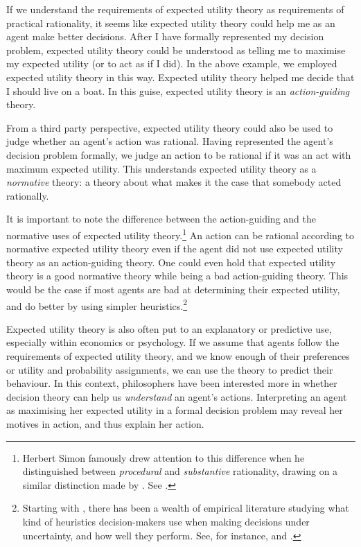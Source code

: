 If we understand the requirements of expected utility theory as requirements of practical rationality, it seems like expected utility theory could help me as an agent make better decisions. After I have formally represented my decision problem, expected utility theory could be understood as telling me to maximise my expected utility (or to act as if I did). In the above example, we employed expected utility theory in this way. Expected utility theory helped me decide that I should live on a boat. In this guise, expected utility theory is an {\em action-guiding} theory.

From a third party perspective, expected utility theory could also be used to judge whether an agent's action was rational. Having represented the agent's decision problem formally, we judge an action to be rational if it was an act with maximum expected utility. This understands expected utility theory as a {\em normative} theory: a theory about what makes it the case that somebody acted rationally.

It is important to note the difference between the action-guiding and the normative uses of expected utility theory.\footnote{Herbert Simon famously drew attention to this difference when he distinguished between {\em procedural} and {\em substantive} rationality, drawing on a similar distinction made by \citet{Weber1922}. See \citet{Simon1976}.} An action can be rational according to normative expected utility theory even if the agent did not use expected utility theory as an action-guiding theory. One could even hold that expected utility theory is a good normative theory while being a bad action-guiding theory. This would be the case if most agents are bad at determining their expected utility, and do better by using simpler heuristics.\footnote{Starting with \citet{TverskyKahneman1974}, there has been a wealth of empirical literature studying what kind of heuristics decision-makers use when making decisions under uncertainty, and how well they perform. See, for instance, \citet{Payneetal1993} and \citet{GigerenzerTodd2000}.}

Expected utility theory is also often put to an explanatory or predictive use, especially within economics or psychology. If we assume that agents follow the requirements of expected utility theory, and we know enough of their preferences or utility and probability assignments, we can use the theory to predict their behaviour. In this context, philosophers have been interested more in whether decision theory can help us {\em understand} an agent's actions. Interpreting an agent as maximising her expected utility in a formal decision problem may reveal her motives in action, and thus explain her action.

